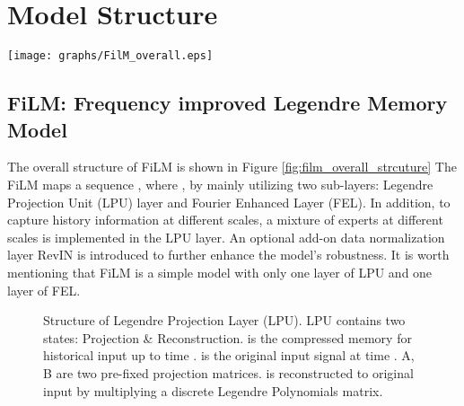 \documentclass{article}
\begin{document}
 \section{Model Structure}\label{sec_model}
\begin{figure*}[t]
\centering
\texttt{[image: graphs/FilM\_overall.eps]}
\caption{Overall structure of FilM (Frequency improved Legendre Memory Model). LPU: Legendre Projection Unit. LPU\_R: reverse recovery of Legendre Projection. FEL: Frequency Enhanced Layer. RevIn: data normalization block. The input data is first normalized and then project to Legendre Polynomials space (LPU memory ). The LPU memory  is processed with FEL and generates the memory  of output. Finally,  is reconstructed and denormalized to output series with . A multiscale structure is employed to process the input with length .} 
\label{fig:film_overall_strcuture}
\vskip -0.10in
\end{figure*}

\subsection{FiLM: Frequency improved Legendre Memory Model}\label{sec:model_structure}
The overall structure of FiLM is shown in Figure \ref{fig:film_overall_strcuture}
The FiLM maps a sequence , where , by mainly utilizing two sub-layers: Legendre Projection Unit (LPU) layer and Fourier Enhanced Layer (FEL). In addition, to capture history information at different scales, a mixture of experts at different scales is implemented in the LPU layer. An optional add-on data normalization layer RevIN \cite{reversible} is introduced to further enhance the model's robustness. It is worth mentioning that FiLM is a simple model with only one layer of LPU and one layer of FEL.

\begin{figure}[t]
\begin{minipage}{\linewidth}
    \centering
\end{minipage}
\caption{Structure of Legendre Projection Layer (LPU). LPU contains two states: Projection \& Reconstruction.  is the compressed memory for historical input up to time .  is the original input signal at time . A, B are two pre-fixed projection matrices.  is reconstructed to original input by multiplying a discrete Legendre Polynomials matrix.}
    \label{fig:LPL}
\vskip -0.1in
\end{figure}
\end{document}
